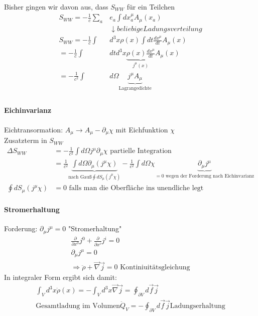 \documentclass[a4paper]{article}
\begin{document}
Bisher gingen wir davon aus, dass $S_{WW}$ für ein Teilchen
\begin{align}
S_{WW}=-\frac{1}{c}\sum_a&e_a\int dx_a^\mu A_\mu(x_a)\\
&\downarrow beliebige Ladungsverteilung\\
S_{WW}=-\frac{1}{c}\int&d^3x\rho(x)\int dt\frac{dx^\mu}{dt}A_\mu(x)\\
=-\frac{1}{c}\int&dtd^3x\underbrace{\rho(x)\frac{dx^\mu}{dt}}_{j^\mu(x)}A_\mu(x)\\
=-\frac{1}{c^2}\int&d\Omega \underbrace{j^\mu A_\mu}_{\text{Lagrangedichte}}\\
\end{align}
\paragraph{Eichinvarianz}
Eichtransormation: $A_\mu\rightarrow A_\mu-\partial_\mu\chi$ mit Eichfunktion
$\chi$\\
Zusatzterm in $S_{WW}$\\
\begin{align}
\Delta S_{WW}&=-\frac{1}{c^2}\int d\Omega j^\mu \partial_\mu\chi
\text{   partielle Integration}\\
&=\frac{1}{c^2}\underbrace{\int d\Omega \partial_\mu(j^\mu\chi)}_{\text{nach
Gauß} \oint dS_\mu(j^\mu\chi)}-\frac{1}{c^2}\int d\Omega
\chi\underbrace{\partial_\mu j^\mu}_{=0 \text{ wegen der Forderung nach
Eichinvarianz}}\\
\oint dS_\mu(j^\mu\chi)&=0 \text{ falls man die Oberfläche ins unendliche legt}
\end{align}
\paragraph{Stromerhaltung}
Forderung: $\partial_\mu j^\mu=0$ "Stromerhaltung"
\begin{align}
\frac{\partial}{\partial x^0}j^0+\frac{\partial}{\partial x^i}j^i=0 \\
\partial_\mu j^\mu=0\\
\Rightarrow \ddot{\rho}+\vec{\nabla}\vec{j}=0 \text{  Kontiniuitätsgleichung}
\end{align}
In integraler Form ergibt sich damit:
\begin{align}
\int_V d^3x\ddot{\rho}(x)=-\int_V d^3x \vec{\nabla}\vec{j} = \oint_{\partial
V}d\vec{f}\vec{j}\\
\text{Gesamtladung im Volumen} \ddot{Q}_V=-\oint_{\partial V}d\vec{f}\vec{j}
\text{Ladungserhaltung}
\end{align}
\end{document}
